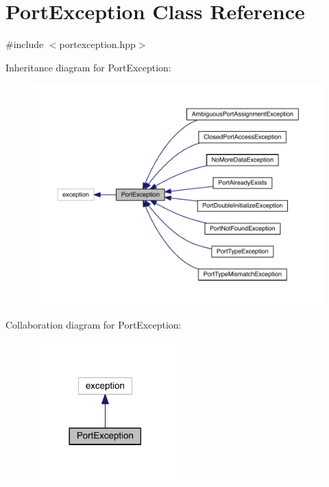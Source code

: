 \hypertarget{class_port_exception}{}\section{Port\+Exception Class Reference}
\label{class_port_exception}


{\ttfamily \#include $<$portexception.\+hpp$>$}



Inheritance diagram for Port\+Exception\+:
\nopagebreak
\begin{figure}[H]
\begin{center}
\leavevmode
\includegraphics[width=350pt]{class_port_exception__inherit__graph}
\end{center}
\end{figure}


Collaboration diagram for Port\+Exception\+:
\nopagebreak
\begin{figure}[H]
\begin{center}
\leavevmode
\includegraphics[width=158pt]{class_port_exception__coll__graph}
\end{center}
\end{figure}
